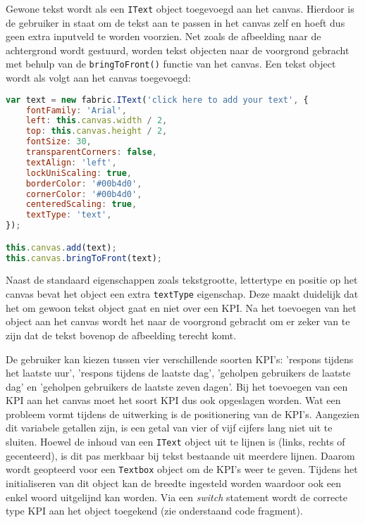 
Gewone tekst wordt als een \lstinline{IText} object toegevoegd aan het canvas. Hierdoor is de gebruiker in staat om de tekst aan te passen in het canvas zelf en hoeft dus geen extra inputveld te worden voorzien. Net zoals de afbeelding naar de achtergrond wordt gestuurd, worden tekst objecten naar de voorgrond gebracht met behulp van de \lstinline{bringToFront()} functie van het canvas. Een tekst object wordt als volgt aan het canvas toegevoegd:

\begin{lstlisting}[language=javascript]
var text = new fabric.IText('click here to add your text', {
	fontFamily: 'Arial',
	left: this.canvas.width / 2,
	top: this.canvas.height / 2,
	fontSize: 30,
	transparentCorners: false,
	textAlign: 'left',
	lockUniScaling: true,
	borderColor: '#00b4d0',
	cornerColor: '#00b4d0',
	centeredScaling: true,
	textType: 'text',
});

this.canvas.add(text);
this.canvas.bringToFront(text);
\end{lstlisting}

Naast de standaard eigenschappen zoals tekstgrootte, lettertype en positie op het canvas bevat het object een extra \lstinline{textType} eigenschap. Deze maakt duidelijk dat het om gewoon tekst object gaat en niet over een KPI. Na het toevoegen van het object aan het canvas wordt het naar de voorgrond gebracht om er zeker van te zijn dat de tekst bovenop de afbeelding terecht komt. 

De gebruiker kan kiezen tussen vier verschillende soorten KPI's: 'respons tijdens het laatste uur', 'respons tijdens de laatste dag', 'geholpen gebruikers de laatste dag' en 'geholpen gebruikers de laatste zeven dagen'. Bij het toevoegen van een KPI aan het canvas moet het soort KPI dus ook opgeslagen worden.%
Wat een probleem vormt tijdens de uitwerking is de positionering van de KPI's. Aangezien dit variabele getallen zijn, is een getal van vier of vijf cijfers lang niet uit te sluiten. Hoewel de inhoud van een \lstinline{IText} object uit te lijnen is (links, rechts of gecenteerd), is dit pas merkbaar bij tekst bestaande uit meerdere lijnen. Daarom wordt geopteerd voor een \lstinline{Textbox} object om de KPI's weer te geven. Tijdens het initialiseren van dit object kan de breedte ingesteld worden waardoor ook een enkel woord uitgelijnd kan worden. Via een \textit{switch} statement wordt de correcte type KPI aan het object toegekend (zie onderstaand code fragment). 


